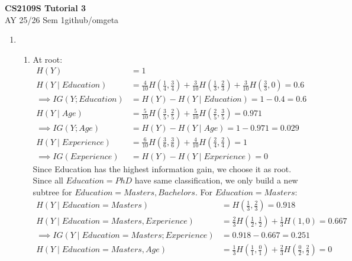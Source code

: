 \documentclass[12pt, a4paper]{article}
\newcommand{\mytitle}{CS2109S Tutorial 3}
\newcommand{\myauthor}{github/omgeta}
\newcommand{\mydate}{AY 25/26 Sem 1}
\begin{document}
\raggedright
\footnotesize
\begin{center}
{\normalsize{\textbf{\mytitle}}} \\
{\footnotesize{\mydate\hspace{2pt}\textemdash\hspace{2pt}\myauthor}}
\end{center}
\begin{enumerate}[\Alph*.]
  \item 
    \begin{enumerate}[\arabic*.]
      \item At root:
        \begin{align*}
          H(Y) &= 1\\
          H(Y\mid Education) &= \frac{4}{10}H(\frac{1}{4}, \frac{3}{4}) + \frac{3}{10}H(\frac{1}{3}, \frac{2}{3}) + \frac{3}{10}H(\frac{3}{3}, 0) = 0.6\\
          \implies IG(Y ; Education) &= H(Y) - H(Y \mid Education) = 1 - 0.4 = 0.6\\ 
          H(Y\mid Age) &= \frac{5}{10}H(\frac{3}{5}, \frac{2}{5}) + \frac{5}{10}H(\frac{2}{5}, \frac{3}{5}) = 0.971\\
          \implies IG(Y; Age) &= H(Y) - H(Y\mid Age) = 1- 0.971 = 0.029\\ 
          H(Y\mid Experience) &= \frac{6}{10}H(\frac{3}{6}, \frac{3}{6}) + \frac{4}{10}H(\frac{2}{4}, \frac{2}{4}) = 1\\
          \implies IG(Experience) &= H(Y) - H(Y\mid Experience) = 0
        \end{align*}
        Since Education has the highest information gain, we choose it as root. Since all $Education = PhD$ have same classification, we only build a new subtree for $Education = Masters, Bachelors$. For $Education = Masters$:
        \begin{align*}
          H(Y\mid Education = Masters) &= H(\frac{1}{3}, \frac{2}{3}) = 0.918\\
          H(Y\mid Education = Masters, Experience) &= \frac{2}{3}H(\frac{1}{2}, \frac{1}{2}) + \frac{1}{3}H(1, 0) = 0.667\\
          \implies IG(Y\mid Education = Masters; Experience) &= 0.918 - 0.667 = 0.251\\
          H(Y\mid Education = Masters, Age) &= \frac{1}{3}H(\frac{1}{1}, \frac{0}{1}) + \frac{2}{3}H(\frac{0}{2}, \frac{2}{2}) = 0\\

\end{align*}
\end{enumerate}
\end{enumerate}
\end{document}
